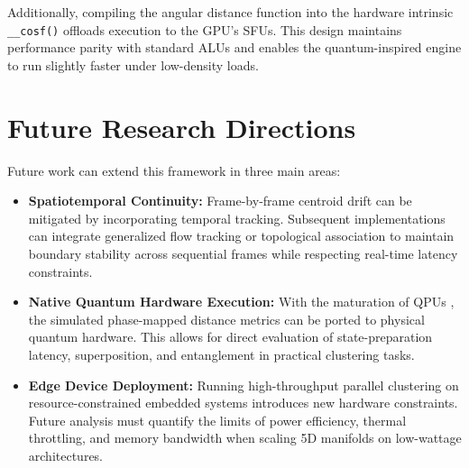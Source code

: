 Additionally, compiling the angular distance function into the hardware intrinsic \texttt{\_\_cosf()} offloads execution to the GPU's SFUs. This design maintains performance parity with standard ALUs and enables the quantum-inspired engine to run slightly faster under low-density loads.

\section{Future Research Directions}
Future work can extend this framework in three main areas:
\begin{itemize}
    \item \textbf{Spatiotemporal Continuity:} Frame-by-frame centroid drift can be mitigated by incorporating temporal tracking. Subsequent implementations can integrate generalized flow tracking \cite{szeliski2022computer, chauhan2013moving} or topological association \cite{kuhn1955hungarian} to maintain boundary stability across sequential frames while respecting real-time latency constraints.
    \item \textbf{Native Quantum Hardware Execution:} With the maturation of QPUs \cite{preskill2018quantum, bharti2022noisy}, the simulated phase-mapped distance metrics can be ported to physical quantum hardware. This allows for direct evaluation of state-preparation latency, superposition, and entanglement in practical clustering tasks.
    \item \textbf{Edge Device Deployment:} Running high-throughput parallel clustering on resource-constrained embedded systems \cite{slimani2019k} introduces new hardware constraints. Future analysis must quantify the limits of power efficiency, thermal throttling, and memory bandwidth when scaling 5D manifolds on low-wattage architectures.
\end{itemize}